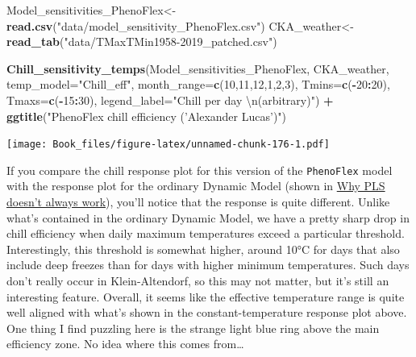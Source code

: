\documentclass[
]{book}
\newenvironment{Shaded}{\begin{snugshade}}{\end{snugshade}}
\newcommand{\CharTok}[1]{\textcolor[rgb]{0.31,0.60,0.02}{#1}}
\newcommand{\DataTypeTok}[1]{\textcolor[rgb]{0.13,0.29,0.53}{#1}}
\newcommand{\DecValTok}[1]{\textcolor[rgb]{0.00,0.00,0.81}{#1}}
\newcommand{\KeywordTok}[1]{\textcolor[rgb]{0.13,0.29,0.53}{\textbf{#1}}}
\newcommand{\NormalTok}[1]{#1}
\newcommand{\OperatorTok}[1]{\textcolor[rgb]{0.81,0.36,0.00}{\textbf{#1}}}
\newcommand{\StringTok}[1]{\textcolor[rgb]{0.31,0.60,0.02}{#1}}
\begin{document}
\begin{Shaded}
\begin{Highlighting}[]
\NormalTok{Model_sensitivities_PhenoFlex<-}
\StringTok{  }\KeywordTok{read.csv}\NormalTok{(}\StringTok{"data/model_sensitivity_PhenoFlex.csv"}\NormalTok{)}
\NormalTok{CKA_weather<-}\KeywordTok{read_tab}\NormalTok{(}\StringTok{"data/TMaxTMin1958-2019_patched.csv"}\NormalTok{)}


\KeywordTok{Chill_sensitivity_temps}\NormalTok{(Model_sensitivities_PhenoFlex,}
\NormalTok{                        CKA_weather,}
                        \DataTypeTok{temp_model=}\StringTok{"Chill_eff"}\NormalTok{,}
                        \DataTypeTok{month_range=}\KeywordTok{c}\NormalTok{(}\DecValTok{10}\NormalTok{,}\DecValTok{11}\NormalTok{,}\DecValTok{12}\NormalTok{,}\DecValTok{1}\NormalTok{,}\DecValTok{2}\NormalTok{,}\DecValTok{3}\NormalTok{),}
                        \DataTypeTok{Tmins=}\KeywordTok{c}\NormalTok{(}\OperatorTok{-}\DecValTok{20}\OperatorTok{:}\DecValTok{20}\NormalTok{),}
                        \DataTypeTok{Tmaxs=}\KeywordTok{c}\NormalTok{(}\OperatorTok{-}\DecValTok{15}\OperatorTok{:}\DecValTok{30}\NormalTok{),}
                        \DataTypeTok{legend_label=}\StringTok{"Chill per day }\CharTok{\textbackslash{}n}\StringTok{(arbitrary)"}\NormalTok{) }\OperatorTok{+}
\StringTok{  }\KeywordTok{ggtitle}\NormalTok{(}\StringTok{"PhenoFlex chill efficiency ('Alexander Lucas')"}\NormalTok{)}
\end{Highlighting}
\end{Shaded}

\texttt{[image: Book\_files/figure-latex/unnamed-chunk-176-1.pdf]}

If you compare the chill response plot for this version of the \texttt{PhenoFlex} model with the response plot for the ordinary Dynamic Model (shown in \protect\hyperlink{pls_chillforce_reflection}{Why PLS doesn't always work}), you'll notice that the response is quite different. Unlike what's contained in the ordinary Dynamic Model, we have a pretty sharp drop in chill efficiency when daily maximum temperatures exceed a particular threshold. Interestingly, this threshold is somewhat higher, around 10°C for days that also include deep freezes than for days with higher minimum temperatures. Such days don't really occur in Klein-Altendorf, so this may not matter, but it's still an interesting feature. Overall, it seems like the effective temperature range is quite well aligned with what's shown in the constant-temperature response plot above. One thing I find puzzling here is the strange light blue ring above the main efficiency zone. No idea where this comes from\ldots{}
\end{document}
